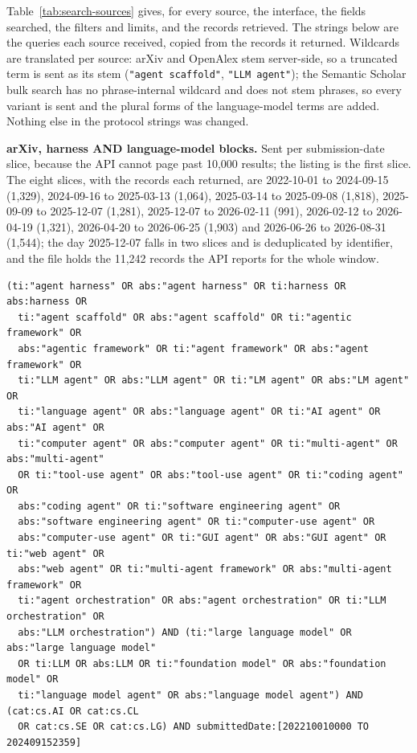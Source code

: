 Table~\ref{tab:search-sources} gives, for every source, the interface, the fields searched, the
filters and limits, and the records retrieved. The strings below are the queries each source
received, copied from the records it returned. Wildcards are translated per source: arXiv and
OpenAlex stem server-side, so a truncated term is sent as its stem (\texttt{"agent scaffold"},
\texttt{"LLM agent"}); the Semantic Scholar bulk search has no phrase-internal wildcard and does not
stem phrases, so every variant is sent and the plural forms of the language-model terms are added.
Nothing else in the protocol strings was changed.

\noindent\textbf{arXiv, harness AND language-model blocks.} Sent per submission-date slice, because
the API cannot page past 10,000 results; the listing is the first slice. The eight slices, with the
records each returned, are 2022-10-01 to 2024-09-15 (1,329), 2024-09-16 to 2025-03-13 (1,064),
2025-03-14 to 2025-09-08 (1,818), 2025-09-09 to 2025-12-07 (1,281), 2025-12-07 to 2026-02-11 (991),
2026-02-12 to 2026-04-19 (1,321), 2026-04-20 to 2026-06-25 (1,903) and 2026-06-26 to 2026-08-31
(1,544); the day 2025-12-07 falls in two slices and is deduplicated by identifier, and the file holds
the 11,242 records the API reports for the whole window.
{\footnotesize
\begin{verbatim}
(ti:"agent harness" OR abs:"agent harness" OR ti:harness OR abs:harness OR
  ti:"agent scaffold" OR abs:"agent scaffold" OR ti:"agentic framework" OR
  abs:"agentic framework" OR ti:"agent framework" OR abs:"agent framework" OR
  ti:"LLM agent" OR abs:"LLM agent" OR ti:"LM agent" OR abs:"LM agent" OR
  ti:"language agent" OR abs:"language agent" OR ti:"AI agent" OR abs:"AI agent" OR
  ti:"computer agent" OR abs:"computer agent" OR ti:"multi-agent" OR abs:"multi-agent"
  OR ti:"tool-use agent" OR abs:"tool-use agent" OR ti:"coding agent" OR
  abs:"coding agent" OR ti:"software engineering agent" OR
  abs:"software engineering agent" OR ti:"computer-use agent" OR
  abs:"computer-use agent" OR ti:"GUI agent" OR abs:"GUI agent" OR ti:"web agent" OR
  abs:"web agent" OR ti:"multi-agent framework" OR abs:"multi-agent framework" OR
  ti:"agent orchestration" OR abs:"agent orchestration" OR ti:"LLM orchestration" OR
  abs:"LLM orchestration") AND (ti:"large language model" OR abs:"large language model"
  OR ti:LLM OR abs:LLM OR ti:"foundation model" OR abs:"foundation model" OR
  ti:"language model agent" OR abs:"language model agent") AND (cat:cs.AI OR cat:cs.CL
  OR cat:cs.SE OR cat:cs.LG) AND submittedDate:[202210010000 TO 202409152359]
\end{verbatim}
}

